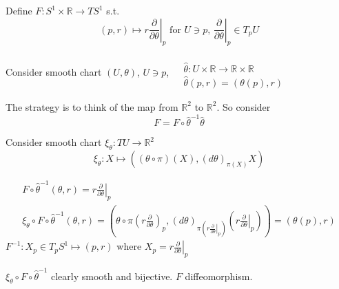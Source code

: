 \documentclass[11pt]{amsart}
\theoremstyle{definition}
\begin{document}
Define $F: S^1 \times \mathbb{R} \to TS^1$ s.t.
\[
(p,r) \mapsto r \left. \frac{ \partial }{ \partial \theta } \right|_p \text{ for } U\ni p, \, \left. \frac{ \partial }{ \partial \theta}\right|_p \in T_pU
\]

Consider smooth chart $(U,\theta)$, $U\ni p$, $\begin{aligned} & \quad \\
  & \widehat{\theta}:U\times \mathbb{R} \to \mathbb{R}\times \mathbb{R} \\
  & \widehat{\theta}(p,r)  = (\theta(p),r) \end{aligned}$

The strategy is to think of the map from $\mathbb{R}^2$ to $\mathbb{R}^2$.  So consider
\[
F=F\circ \widehat{\theta}^{-1}\widehat{\theta}
\]

Consider smooth chart $\xi_{\theta}:TU \to \mathbb{R}^2$
\[
\xi_{\theta}:X \mapsto ((\theta \circ \pi)(X), (d\theta)_{\pi(X)}X)
\]

\[
\begin{gathered}
  F\circ \widehat{\theta}^{-1}(\theta,r) = r \left. \frac{ \partial }{ \partial \theta }\right|_p \\
\xi_{\theta} \circ F\circ \widehat{\theta}^{-1}(\theta,r) = \left( \theta\circ \pi \left( r \frac{ \partial }{ \partial \theta }\right)_p , (d\theta)_{\pi(r\left. \frac{ \partial }{ \partial \theta }\right|_p ) }\left( \left. r \frac{ \partial }{ \partial \theta }\right|_p  \right) \right)= (\theta(p),r)
\end{gathered}
\]
$F^{-1}:X_p \in T_pS^1 \mapsto (p,r)$ where $X_p = \left. r\frac{ \partial }{ \partial \theta }\right|_p$

$\xi_{\theta}\circ F \circ \widehat{\theta}^{-1}$ clearly smooth and bijective.  $F$ diffeomorphism.
\end{document}
